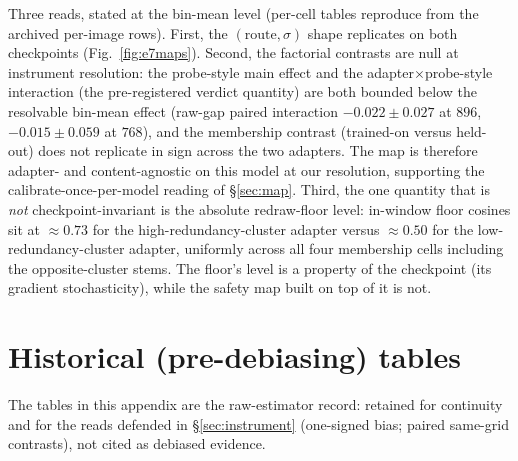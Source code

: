 Three reads, stated at the bin-mean level (per-cell tables reproduce
from the archived per-image rows). First, the $(\text{route}, \sigma)$
shape replicates on both checkpoints (Fig.~\ref{fig:e7maps}). Second,
the factorial contrasts are null at instrument resolution: the
probe-style main effect and the adapter$\times$probe-style interaction
(the pre-registered verdict quantity) are both bounded below the
resolvable bin-mean effect (raw-gap paired interaction
$-0.022 \pm 0.027$ at $896$, $-0.015 \pm 0.059$ at $768$), and the
membership contrast (trained-on versus held-out) does not replicate in
sign across the two adapters. The map is therefore adapter- and
content-agnostic on this model at our resolution, supporting the
calibrate-once-per-model reading of \S\ref{sec:map}. Third, the one
quantity that is \emph{not} checkpoint-invariant is the absolute
redraw-floor level: in-window floor cosines sit at ${\approx}0.73$ for
the high-redundancy-cluster adapter versus ${\approx}0.50$ for the
low-redundancy-cluster adapter, uniformly across all four membership
cells including the opposite-cluster stems. The floor's level is a property of the
checkpoint (its gradient stochasticity), while the safety map built on
top of it is not.

\section{Historical (pre-debiasing) tables}
\label{app:tables}

The tables in this appendix are the raw-estimator record: retained for
continuity and for the reads defended in \S\ref{sec:instrument}
(one-signed bias; paired same-grid contrasts), not cited as debiased
evidence.

